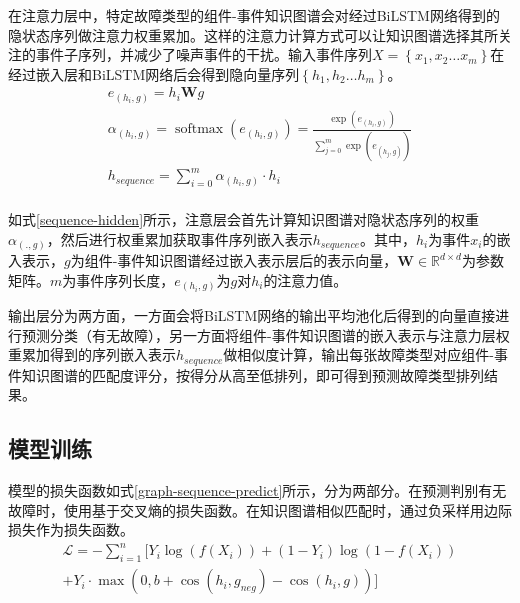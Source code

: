 在注意力层中，特定故障类型的组件-事件知识图谱会对经过BiLSTM网络得到的隐状态序列做注意力权重累加。这样的注意力计算方式可以让知识图谱选择其所关注的事件子序列，并减少了噪声事件的干扰。输入事件序列$X=\left\{x_{1}, x_{2} \ldots x_{m}\right\}$在经过嵌入层和BiLSTM网络后会得到隐向量序列$\left\{h_{1}, h_{2} \ldots h_{m}\right\}$。
\begin{equation}
    \begin{array}{l}
    e_{(h_{i} , g)} = h_{i}\mathbf{W}g\\
    \alpha_{(h_{i} , g)}=\operatorname{softmax}\left(e_{(h_{i} , g)}\right)=\frac{\exp \left(e_{(h_{i} , g)}\right)}{\sum_{j=0}^{m}  \exp \left(e_{\left(h_{j} , g\right )}\right)}\\
    h_{sequence} = \sum_{i=0}^{m}\alpha_{(h_{i} , g)}\cdot h_{i}\\
    \end{array}
    \label{sequence-hidden}
\end{equation}

如式\ref{sequence-hidden}所示，注意层会首先计算知识图谱对隐状态序列的权重$\alpha_{(. , g)}$，然后进行权重累加获取事件序列嵌入表示$h_{sequence}$。其中，$h_i$为事件$x_i$的嵌入表示，$g$为组件-事件知识图谱经过嵌入表示层后的表示向量，$\mathbf{W} \in \mathbb{R}^{d\times d}$为参数矩阵。$m$为事件序列长度，$e_{(h_{i} , g)}$为$g$对$h_{i}$的注意力值。   

输出层分为两方面，一方面会将BiLSTM网络的输出平均池化后得到的向量直接进行预测分类（有无故障），另一方面将组件-事件知识图谱的嵌入表示与注意力层权重累加得到的序列嵌入表示$h_{sequence}$做相似度计算，输出每张故障类型对应组件-事件知识图谱的匹配度评分，按得分从高至低排列，即可得到预测故障类型排列结果。

\subsection{模型训练}
模型的损失函数如式\ref{graph-sequence-predict}所示，分为两部分。在预测判别有无故障时，使用基于交叉熵的损失函数。在知识图谱相似匹配时，通过负采样用边际损失作为损失函数。
\begin{equation}
    \begin{aligned}
        \mathcal{L}=-\sum_{i=1}^{n}[Y_{i} \log \left(f\left(X_{i} \right)\right)
        +\left(1-Y_{i}\right) \log \left(1-f\left(X_{i} \right)\right)\\
+Y_{i}\cdot \max \left (0, b +\operatorname{cos} \left (h_{i},  g_{neg} \right ) - \operatorname{cos} \left (h_{i}, g \right )\right )]
    \end{aligned}
    \label{graph-sequence-predict}
\end{equation}

